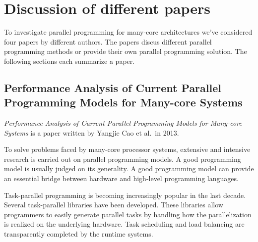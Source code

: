 \section{Discussion of different papers} \label{papers}

To investigate parallel programming for many-core architectures we've
considered four papers by different authors. The papers discus different
parallel programming methods or provide their own parallel programming
solution. The following sections each summarize a paper.

\subsection{Performance Analysis of Current Parallel Programming Models for Many-core Systems}

\emph{Performance Analysis of Current Parallel Programming Models for Many-core
Systems} \cite{CaoPerformanceAnalysis} is a paper written by Yangjie Cao et
al.\ in 2013.

%

To solve problems faced by many-core processor systems, extensive and intensive
research is carried out on parallel programming models. A good programming
model is usually judged on its generality. A good programming model can provide
an essential bridge between hardware and high-level programming languages.


Task-parallel programming is becoming increasingly popular in the last decade.
Several task-parallel libraries have been developed. 
These libraries allow programmers to easily generate parallel tasks by handling how the parallelization is realized on the underlying hardware. 
Task scheduling and load balancing are transparently completed by the runtime systems.

